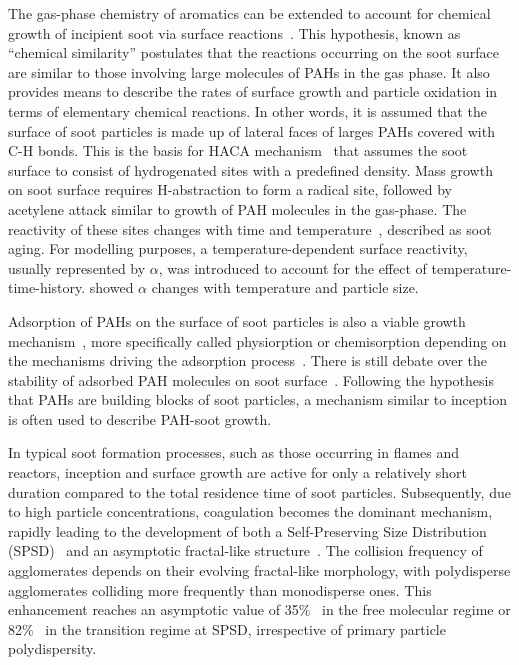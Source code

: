The gas-phase chemistry of aromatics can be extended to account for chemical growth of incipient soot via surface reactions~\citep{frenklach2002reaction}. This hypothesis, known as “chemical similarity” postulates that the reactions occurring on the soot surface are similar to those involving large molecules of PAHs in the gas phase. It also provides means to describe the rates of surface growth and particle oxidation in
terms of elementary chemical reactions. In other words, it is assumed that the surface of soot particles is made up of lateral faces of larges PAHs covered with C-H bonds.
This is the basis for HACA mechanism~\citep{frenklach1991detailed, appel2000kinetic}  that assumes the soot surface to consist of hydrogenated sites with a predefined density. Mass growth on soot surface requires H-abstraction to form a radical
site, followed by acetylene attack similar to growth of PAH molecules in the gas-phase. The reactivity of these sites changes with time and temperature~\citep{woods1991soot, dasch1985decay}, described as soot aging. For modelling purposes, a temperature-dependent surface reactivity, usually represented by $\alpha$, was introduced to account for the effect of temperature-time-history. \citet{appel2000kinetic} showed $\alpha$ changes with temperature and particle size.


Adsorption of PAHs on the surface of soot particles is also a viable growth mechanism~\citep{frenklach1991detailed}, more specifically called physiorption or chemisorption depending on the mechanisms driving the adsorption process~\citep{michelsen2020review}. There is still debate over the stability of adsorbed PAH molecules on soot surface~\citep{obolensky2007interplay}. Following the hypothesis that PAHs are building blocks of soot particles, a mechanism similar to inception is often used to describe  PAH-soot growth.


In typical soot formation processes, such as those occurring in flames and reactors, inception and surface growth are active for only a relatively short duration compared to the total residence time of soot particles. Subsequently, due to high particle concentrations, coagulation becomes the dominant mechanism, rapidly leading to the development of both a Self-Preserving Size Distribution (SPSD)~\citep{lai1972self} and an asymptotic fractal-like structure~\citep{mountain1986simulation, Goudeli2016}.
The collision frequency of agglomerates depends on their evolving fractal-like morphology, with polydisperse agglomerates colliding more frequently than monodisperse ones. This enhancement reaches an asymptotic value of 35$\%$~\citep{Goudeli2016} in the free molecular regime or 82$\%$~\citep{kelesidis2021self} in the transition regime at SPSD, irrespective of primary particle polydispersity.

